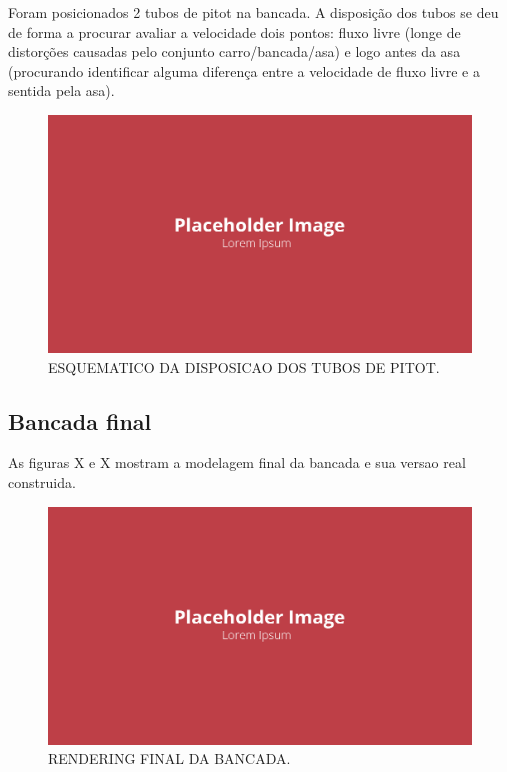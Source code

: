 Foram posicionados 2 tubos de pitot na bancada. A disposição dos tubos se deu de forma a procurar avaliar a velocidade dois pontos: fluxo livre (longe de distorções causadas pelo conjunto carro/bancada/asa) e logo antes da asa (procurando identificar alguma diferença entre a velocidade de fluxo livre e a sentida pela asa).

\begin{figure}[!ht]
    \centering
    \includegraphics[width=.8\linewidth]{figuras/placeholder.png}
    \caption{ESQUEMATICO DA DISPOSICAO DOS TUBOS DE PITOT\cite{autor}.}
    \label{fig:placeholder}
\end{figure}

\subsection{Bancada final}

As figuras X e X mostram a modelagem final da bancada e sua versao real construida.

\begin{figure}[!ht]
    \centering
    \includegraphics[width=.8\linewidth]{figuras/placeholder.png}
    \caption{RENDERING FINAL DA BANCADA\cite{autor}.}
    \label{fig:placeholder}
\end{figure}

